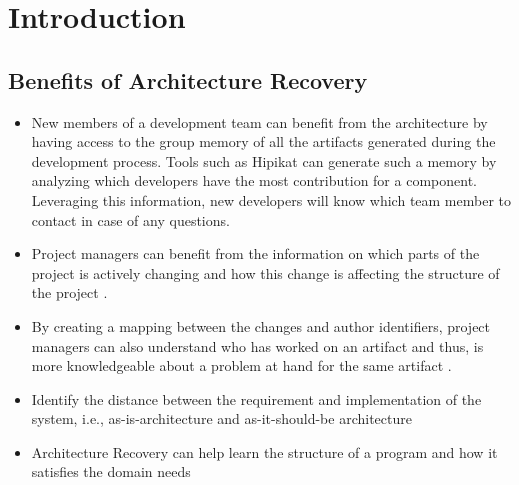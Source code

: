 \chapter{Introduction}

\section{Benefits of Architecture Recovery}
\begin{itemize}
    \item New members of a development team can benefit from the architecture by having access to the group memory of all the artifacts generated during the development process. Tools such as Hipikat \cite{Cubranic2005} can generate such a memory by analyzing which developers have the most contribution for a component. Leveraging this information, new developers will know which team member to contact in case of any questions.
    \item Project managers can benefit from the information on which parts of the project is actively changing and how this change is affecting the structure of the project \cite{leh80}.
    \item By creating a mapping between the changes and author identifiers, project managers can also understand who has worked on an artifact and thus, is more knowledgeable about a problem at hand for the same artifact \cite{Girba05}.
    \item Identify the distance between the requirement and implementation of the system, i.e., as-is-architecture and as-it-should-be architecture \cite{eixelberger98}
    \item Architecture Recovery can help learn the structure of a program and how it satisfies the domain needs 
\end{itemize}


